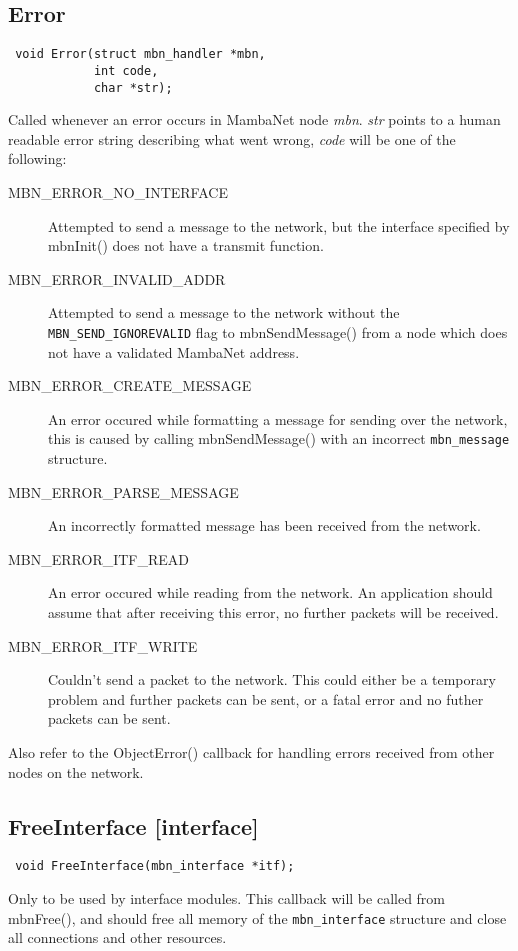 \documentclass[a4paper]{report}
\begin{document}
\subsection{Error}
\begin{verbatim}
 void Error(struct mbn_handler *mbn,
            int code,
            char *str);
\end{verbatim}
Called whenever an error occurs in MambaNet node \textit{mbn}. \textit{str} points to a human readable error string describing what went wrong, \textit{code} will be one of the following:
\begin{description}
 \item[MBN\_ERROR\_NO\_INTERFACE]
  Attempted to send a message to the network, but the interface specified by mbnInit() does not have a transmit function.
 \item[MBN\_ERROR\_INVALID\_ADDR]
  Attempted to send a message to the network without the  \verb|MBN_SEND_IGNOREVALID| flag to mbnSendMessage() from a node which does not have a validated MambaNet address.
 \item[MBN\_ERROR\_CREATE\_MESSAGE]
  An error occured while formatting a message for sending over the network, this is caused by calling mbnSendMessage() with an incorrect \verb|mbn_message| structure.
 \item[MBN\_ERROR\_PARSE\_MESSAGE]
  An incorrectly formatted message has been received from the network.
 \item[MBN\_ERROR\_ITF\_READ]
  An error occured while reading from the network. An application should assume that after receiving this error, no further packets will be received.
 \item[MBN\_ERROR\_ITF\_WRITE]
  Couldn't send a packet to the network. This could either be a temporary problem and further packets can be sent, or a fatal error and no futher packets can be sent.
\end{description}

Also refer to the ObjectError() callback for handling errors received from other nodes on the network.


\subsection{FreeInterface \footnotesize{[interface]}}
\begin{verbatim}
 void FreeInterface(mbn_interface *itf);
\end{verbatim}
Only to be used by interface modules. This callback will be called from mbnFree(), and should free all memory of the \verb|mbn_interface| structure and close all connections and other resources.
\end{document}
